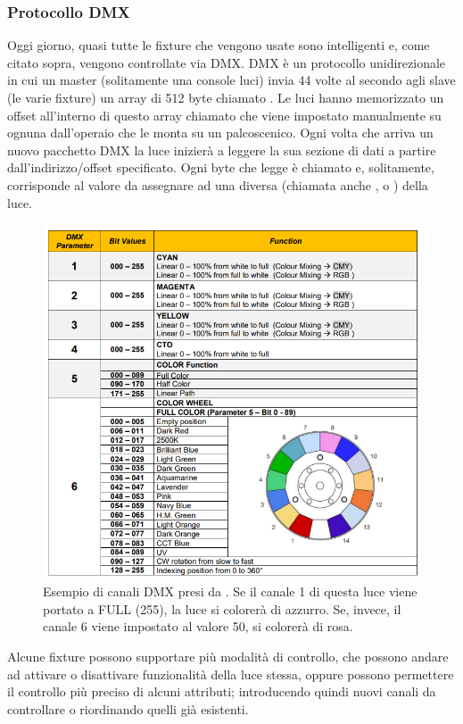 \documentclass[main.tex]{subfiles}
\begin{document}
\subsubsection{Protocollo DMX}\label{subsec:1_1_dmx}
Oggi giorno, quasi tutte le fixture che vengono usate sono intelligenti e, come citato sopra, vengono controllate via DMX. DMX è un protocollo unidirezionale in cui un master (solitamente una console luci) invia 44 volte al secondo agli slave (le varie fixture) un array di 512 byte chiamato . Le luci hanno memorizzato un offset all'interno di questo array chiamato  che viene impostato manualmente su ognuna dall'operaio che le monta su un palcoscenico. Ogni volta che arriva un nuovo pacchetto DMX la luce inizierà a leggere la sua sezione di dati a partire dall'indirizzo/offset specificato. Ogni byte che legge è chiamato  e, solitamente, corrisponde al valore da assegnare ad una diversa  (chiamata anche , o ) della luce.
\begin{figure}[H]
    \centering
    \includegraphics[width=0.65\linewidth]{img/introduzione/dmxChannelDescExample.png}
    \caption{Esempio di canali DMX presi da \cite{fig_1_dmxChart}. Se il canale 1 di questa luce viene portato a FULL (255), la luce si colorerà di azzurro. Se, invece, il canale 6 viene impostato al valore 50, si colorerà di rosa.}
    \label{fig:1_dmxChannelsExample}
\end{figure}

\noindent Alcune fixture possono supportare più modalità di controllo, che possono andare ad attivare o disattivare funzionalità della luce stessa, oppure possono permettere il controllo più preciso di alcuni attributi; introducendo quindi nuovi canali da controllare o riordinando quelli già esistenti. 
\end{document}
